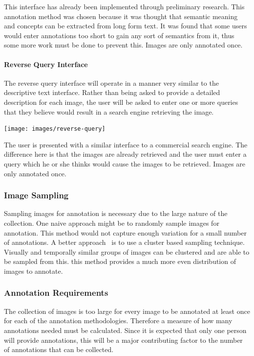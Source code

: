 \documentclass[12pt,a4paper]{article}
\begin{document}
This interface has already been implemented through preliminary research. This annotation method was chosen because it was thought that semantic meaning and concepts can be extracted from long form text. It was found that some users would enter annotations too short to gain any sort of semantics from it, thus some more work must be done to prevent this. Images are only annotated once.

\paragraph{Reverse Query Interface}
The reverse query interface will operate in a manner very similar to the descriptive text interface. Rather than being asked to provide a detailed description for each image, the user will be asked to enter one or more queries that they believe would result in a search engine retrieving the image.

\begin{center}
    \texttt{[image: images/reverse-query]}
\end{center}

The user is presented with a similar interface to a commercial search engine. The difference here is that the images are already retrieved and the user must enter a query which he or she thinks would cause the images to be retrieved. Images are only annotated once.
 
\subsubsection{Image Sampling}
Sampling images for annotation is necessary due to the large nature of the collection. One naive approach might be to randomly sample images for annotation. This method would not capture enough variation for a small number of annotations. A better approach~\cite{harry2016lifelog} is to use a cluster based sampling technique. Visually and temporally similar groups of images can be clustered and are able to be sampled from this. this method provides a much more even distribution of images to annotate.

\subsubsection{Annotation Requirements}
The collection of images is too large for every image to be annotated at least once for each of the annotation methodologies. Therefore a measure of how many annotations needed must be calculated. Since it is expected that only one person will provide annotations, this will be a major contributing factor to the number of annotations that can be collected.
\end{document}

